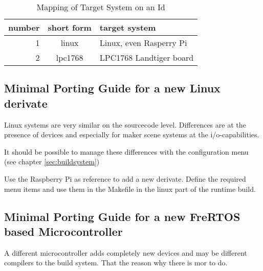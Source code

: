 	\begin{table}[bpht]
	\begin{tabular}{|r|c|l|}
	\hline
	number & short form & target system \\
	\hline
	1 & linux &  Linux, even Rasperry Pi\\
	2 & lpc1768 & LPC1768 Landtiger board \\
	\hline
	\end{tabular}
	\caption{Mapping of Target System on an  Id}
	\label{tab:targetId}
	\end{table}

	\subsection{Minimal Porting Guide for a new Linux derivate}
	Linux systems are very similar on the sourcecode level. Differences are
	at the presence of devices and especially for maker scene systems at 
	the i/o-capabilities.

	It should be possible to manage these differences with the 
	configuration menu (see chapter \ref{sec:buildsystem})

	Use the Raspberry Pi as reference to  add a new derivate. 
	Define the required menu items and use them in the Makefile in the 
	linux part of the runtime build.

	\subsection{Minimal Porting Guide for a new FreRTOS based Microcontroller}
	A different microcontroller adds completely new devices and may be different
	compilers to the build system. That the reason why there is mor to do.

